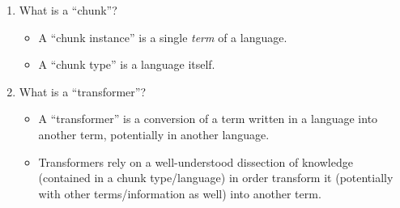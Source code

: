 \begin{enumerate}

      \item What is a ``chunk''?
            \begin{itemize}

                  \item A ``chunk instance'' is a single \textit{term} of a
                        language.
                        
                  \item A ``chunk type'' is a language itself.
                  
            \end{itemize}

      \item What is a ``transformer''?
            \begin{itemize}

                  \item A ``transformer'' is a conversion of a term written in a
                        language into another term, potentially in another
                        language.
                        
                  \item Transformers rely on a well-understood dissection of
                        knowledge (contained in a chunk type/language) in order
                        transform it (potentially with other terms/information
                        as well) into another term.
                        
            \end{itemize}

\end{enumerate}
